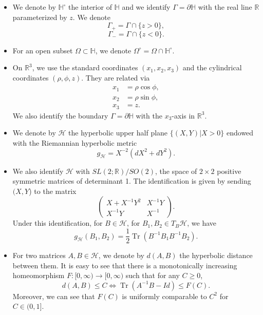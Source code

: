 \documentclass[a4paper,11pt]{amsart}
\theoremstyle{definition}
\numberwithin{equation}{section}
\newcommand{\p}{\partial}
\newcommand{\dH}{\mathbb{H}}
\newcommand{\R}{\mathbb{R}}
\newcommand{\bH}{\mathbb H}
\DeclareMathOperator{\Tr}{Tr}
\begin{document}
\begin{itemize}
Translation: 
\begin{equation}\label{eqn:translation} T_{\underline z}:\bH\rightarrow\bH; (\rho, z)\mapsto (\rho, z-\underline z), \ \ \ \underline z\in \R.
\end{equation}
 	\item We denote by $\mathbb H^\circ$ the interior of $\dH$ and we identify $\Gamma=\p \mathbb H$ with the real line $\R$ parameterized by $z$. We denote 
    $$\Gamma_+=\Gamma\cap \{z>0\},$$
    $$\Gamma_-=\Gamma\cap \{z<0\}.$$
 	\item For an open subset $\Omega\subset \dH$, we denote  $\Omega^\circ=\Omega\cap \dH^\circ$. 
 	\item On $\R^3$, we use the standard coordinates $(x_1, x_2, x_3)$ and the cylindrical coordinates $(\rho, \phi, z)$. They are related via
\begin{align*}
    x_1 &= \rho\cos\phi, \\
    x_2 &= \rho\sin\phi, \\
    x_3 &= z.
\end{align*}We also identify the boundary $\Gamma=\p\mathbb H$ with the $x_3$-axis in $\R^3$.
\item We denote by $\mathcal H$ the hyperbolic upper half plane $\{(X,Y)|X>0\}$ endowed with the Riemannian hyperbolic metric $$g_{\mathcal H}=X^{-2}(dX^2+dY^2).$$
\item We also identify $\mathcal H$ with $SL(2;\R)/SO(2)$, the space of $2\times 2$ positive symmetric matrices of determinant 1. The identification is given by sending $(X, Y$) to the matrix
\begin{equation}\label{e:1.1}\left(\begin{matrix}X+X^{-1}Y^2&X^{-1}Y\\X^{-1}Y&X^{-1} \end{matrix}\right).
\end{equation}
Under this identification, for $B\in \mathcal H$,  for $B_1,  B_2\in T_B\mathcal{H}$, we have   $$g_{\mathcal H}( B_1, B_2)=\frac12\Tr(B^{-1} B_1B^{-1} B_2).$$ 
\item For two   matrices $A,B\in \mathcal H$, we denote by $d(A, B)$ the hyperbolic distance between them. It is easy to see that there is a monotonically increasing homeomorphism $F: [0, \infty)\rightarrow [0, \infty)$ such that for any $C\geq 0$,  
\begin{equation}\label{e:hyperbolic distance equivalent control}d(A, B)\leq C \Longleftrightarrow \Tr(A^{-1}B-Id)\leq F(C).	
\end{equation}
Moreover, we can see that $F(C)$ is uniformly comparable to $C^2$ for $C\in (0, 1]$.


\end{itemize}
\end{document}
